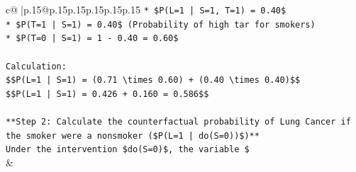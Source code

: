 \documentclass{article}
\begin{document}
{\begin{supertabular}{c@{$\;$}|p{.15\linewidth}@{}p{.15\linewidth}p{.15\linewidth}p{.15\linewidth}p{.15\linewidth}p{.15\linewidth}}
{{{\texttt{*   \$P(L=1 | S=1, T=1) = 0.40\$} \\
\texttt{*   \$P(T=1 | S=1) = 0.40\$ (Probability of high tar for smokers)} \\
\texttt{*   \$P(T=0 | S=1) = 1 {-} 0.40 = 0.60\$} \\
\\ 
\texttt{Calculation:} \\
\texttt{\$\$P(L=1 | S=1) = (0.71 \textbackslash{}times 0.60) + (0.40 \textbackslash{}times 0.40)\$\$} \\
\texttt{\$\$P(L=1 | S=1) = 0.426 + 0.160 = 0.586\$\$} \\
\\ 
\texttt{**Step 2: Calculate the counterfactual probability of Lung Cancer if the smoker were a nonsmoker (\$P(L=1 | do(S=0))\$)**} \\
\texttt{Under the intervention \$do(S=0)\$, the variable \$} \\
            }
        }
    }
    & \\ \\


\end{supertabular}}
\end{document}
